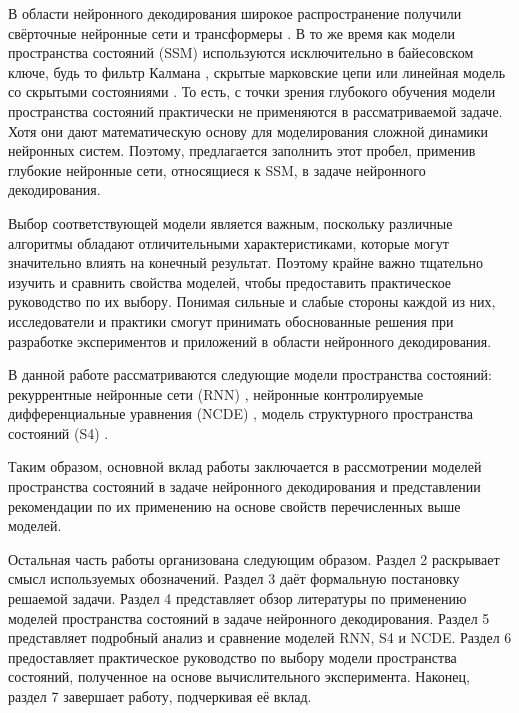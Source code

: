 \documentclass[a4paper, 12pt]{article}
\begin{document}
	В области нейронного декодирования широкое распространение получили свёрточные нейронные сети \citep{eegnet, htnet} и трансформеры \citep{defossez2022decoding, tang2023semantic}.
	В то же время как модели пространства состояний (SSM) используются исключительно в байесовском ключе, будь то фильтр Калмана \citep{kalman1961}, скрытые марковские цепи \citep{paninski2010new} или линейная модель со скрытыми состояниями \citep{wu2009neural}.
	То есть, с точки зрения глубокого обучения модели пространства состояний практически не применяются в рассматриваемой задаче.
	Хотя они дают математическую основу для моделирования сложной динамики нейронных систем.
	Поэтому, предлагается заполнить этот пробел, применив глубокие нейронные сети, относящиеся к SSM, в задаче нейронного декодирования.
	
	Выбор соответствующей модели является важным, поскольку различные алгоритмы обладают отличительными характеристиками, которые могут значительно влиять на конечный результат.
	Поэтому крайне важно тщательно изучить и сравнить свойства моделей, чтобы предоставить практическое руководство по их выбору. 
	Понимая сильные и слабые стороны каждой из них, исследователи и практики смогут принимать обоснованные решения при разработке экспериментов и приложений в области нейронного декодирования.
	
	В данной работе рассматриваются следующие модели пространства состояний: рекуррентные нейронные сети (RNN) \citep{rnn}, нейронные контролируемые дифференциальные уравнения (NCDE) \citep{ncde}, модель структурного пространства состояний (S4) \citep{s4}.
	
	Таким образом, основной вклад работы заключается в рассмотрении моделей пространства состояний в задаче нейронного декодирования и представлении рекомендации по их применению на основе свойств перечисленных выше моделей.
	
	Остальная часть работы организована следующим образом. Раздел 2 раскрывает смысл используемых обозначений. Раздел 3 даёт формальную постановку решаемой задачи. Раздел 4 представляет обзор литературы по применению моделей пространства состояний в задаче нейронного декодирования. Раздел 5 представляет подробный анализ и сравнение моделей RNN, S4 и NCDE. Раздел 6 предоставляет практическое руководство по выбору модели пространства состояний, полученное на основе вычислительного эксперимента. Наконец, раздел 7 завершает работу, подчеркивая её вклад.
	
\end{document}
